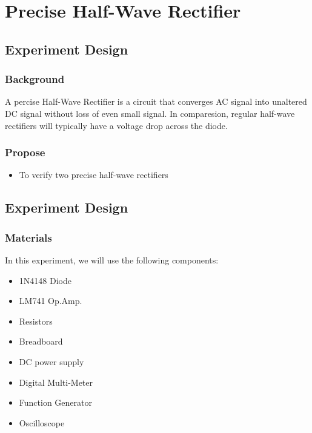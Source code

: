 \setcounter{section}{11}
\section{Precise Half-Wave Rectifier}

\subsection{Experiment Design}
    \subsubsection{Background}
        A percise Half-Wave Rectifier is a circuit that converges AC signal into unaltered DC signal without loss of even small signal. In comparesion, regular half-wave rectifiers will typically have a voltage drop across the diode.\par


    \subsubsection{Propose}
    \begin{itemize}
        \item To verify two precise half-wave rectifiers
        \end{itemize}

\subsection{Experiment Design}
    \subsubsection{Materials}
        In this experiment, we will use the following components:
        \begin{itemize}
            \item 1N4148 Diode
            \item LM741 Op.Amp.
            \item Resistors
            \item Breadboard
            \item   DC power supply
            \item Digital Multi-Meter
            \item Function Generator
            \item Oscilloscope
        \end{itemize}

